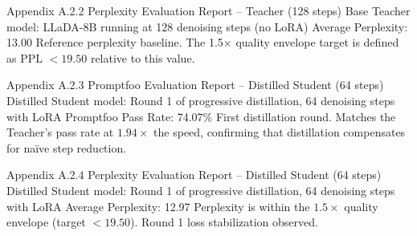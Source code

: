 \documentclass[11pt, a4paper]{article}
\begin{document}
\annexcover%
    {Appendix A.2.2}%
    {Perplexity Evaluation Report – Teacher (128 steps)}%
    {Base Teacher model: LLaDA-8B running at 128 denoising steps (no LoRA)}%
    {Average Perplexity: 13.00}%
    {Reference perplexity baseline. The 1.5$\times$ quality envelope target is defined as PPL $< 19.50$ relative to this value.}

\annexcover%
    {Appendix A.2.3}%
    {Promptfoo Evaluation Report – Distilled Student (64 steps)}%
    {Distilled Student model: Round 1 of progressive distillation, 64 denoising steps with LoRA}%
    {Promptfoo Pass Rate: 74.07\%}%
    {First distillation round. Matches the Teacher's pass rate at $1.94\times$ the speed, confirming that distillation compensates for na\"{i}ve step reduction.}

\annexcover%
    {Appendix A.2.4}%
    {Perplexity Evaluation Report – Distilled Student (64 steps)}%
    {Distilled Student model: Round 1 of progressive distillation, 64 denoising steps with LoRA}%
    {Average Perplexity: 12.97}%
    {Perplexity is within the $1.5\times$ quality envelope (target $< 19.50$). Round 1 loss stabilization observed.}
\end{document}
